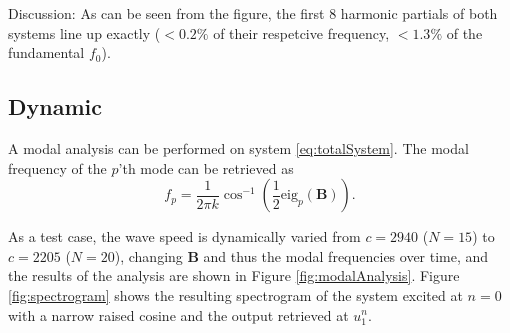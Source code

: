 \documentclass[dvipsnames, reprint]{JASA}
\def\SWcomment[#1]{\textcolor{Bittersweet}{#1}}
\begin{document}
\SWcomment[Discussion:] As can be seen from the figure, the first 8 harmonic partials of both systems line up exactly ($<0.2\%$ of their respetcive frequency, $<1.3\%$ of the fundamental $f_0$). 

\subsection{Dynamic}
A modal analysis can be performed on system \eqref{eq:totalSystem}. The modal frequency of the $p$'th mode can be retrieved as
\begin{equation}
    f_p = \frac{1}{2\pi k}\cos^{-1}\left(\frac{1}{2}\text{eig}_p(\mathbf{B})\right).
\end{equation}

As a test case, the wave speed is dynamically varied from $c = 2940$ ($N = 15$) to $c = 2205$ ($N = 20$), changing $\mathbf{B}$ and thus the modal frequencies over time, and the results of the analysis are shown in Figure \ref{fig:modalAnalysis}. Figure \ref{fig:spectrogram} shows the resulting spectrogram of the system excited at $n=0$ with a narrow raised cosine and the output retrieved at $u_1^n$.
\end{document}
